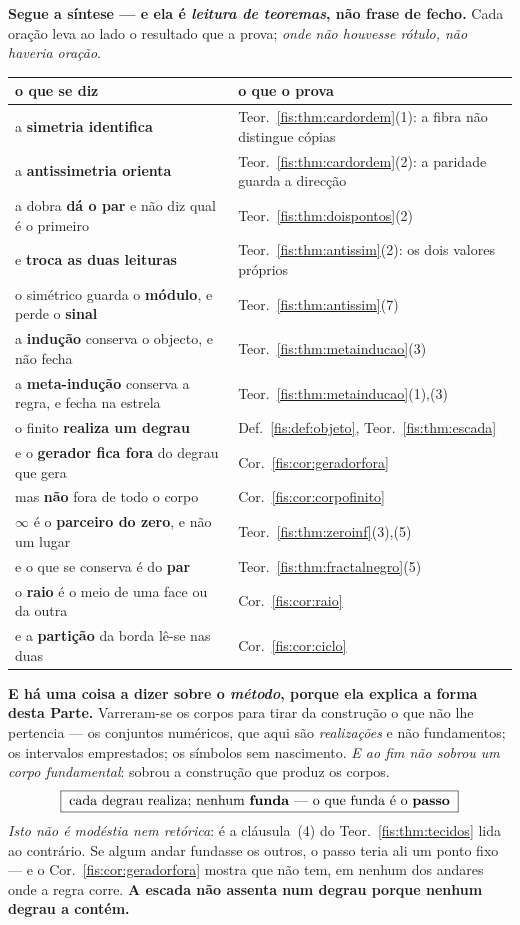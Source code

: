 \documentclass[livro.tex]{subfiles}
\begin{document}
\noindent\textbf{Segue a síntese --- e ela é \emph{leitura de teoremas}, não
frase de fecho.} Cada oração leva ao lado o resultado que a prova; \emph{onde não
houvesse rótulo, não haveria oração}.
\begin{center}\small
\begin{tabular}{@{}ll@{}}
\toprule
o que se diz & o que o prova \\
\midrule
a \textbf{simetria identifica} & Teor.~\ref{fis:thm:cardordem}(1): a fibra não distingue cópias \\
a \textbf{antissimetria orienta} & Teor.~\ref{fis:thm:cardordem}(2): a paridade guarda a direcção \\
a dobra \textbf{dá o par} e não diz qual é o primeiro & Teor.~\ref{fis:thm:doispontos}(2) \\
e \textbf{troca as duas leituras} & Teor.~\ref{fis:thm:antissim}(2): os dois valores próprios \\
o simétrico guarda o \textbf{módulo}, e perde o \textbf{sinal} & Teor.~\ref{fis:thm:antissim}(7) \\
a \textbf{indução} conserva o objecto, e não fecha & Teor.~\ref{fis:thm:metainducao}(3) \\
a \textbf{meta-indução} conserva a regra, e fecha na estrela & Teor.~\ref{fis:thm:metainducao}(1),(3) \\
o finito \textbf{realiza um degrau} & Def.~\ref{fis:def:objeto}, Teor.~\ref{fis:thm:escada} \\
e o \textbf{gerador fica fora} do degrau que gera & Cor.~\ref{fis:cor:geradorfora} \\
mas \textbf{não} fora de todo o corpo & Cor.~\ref{fis:cor:corpofinito} \\
$\infty$ é o \textbf{parceiro do zero}, e não um lugar & Teor.~\ref{fis:thm:zeroinf}(3),(5) \\
e o que se conserva é do \textbf{par} & Teor.~\ref{fis:thm:fractalnegro}(5) \\
o \textbf{raio} é o meio de uma face ou da outra & Cor.~\ref{fis:cor:raio} \\
e a \textbf{partição} da borda lê-se nas duas & Cor.~\ref{fis:cor:ciclo} \\
\bottomrule
\end{tabular}
\end{center}

\medskip\noindent\textbf{E há uma coisa a dizer sobre o \emph{método}, porque ela
explica a forma desta Parte.} Varreram-se os corpos para tirar da construção o que
não lhe pertencia --- os conjuntos numéricos, que aqui são \emph{realizações} e
não fundamentos; os intervalos emprestados; os símbolos sem nascimento. \emph{E ao
fim não sobrou um corpo fundamental}: sobrou a construção que produz os corpos.
\[
\boxed{\;\text{cada degrau realiza; nenhum \textbf{funda} --- o que funda é o \textbf{passo}}\;}
\]
\emph{Isto não é modéstia nem retórica}: é a cláusula~(4) do
Teor.~\ref{fis:thm:tecidos} lida ao contrário. Se algum andar fundasse os
outros, o passo teria ali um ponto fixo --- e o Cor.~\ref{fis:cor:geradorfora}
mostra que não tem, em nenhum dos andares onde a regra corre. \textbf{A escada não assenta num
degrau porque nenhum degrau a contém.}
\end{document}
